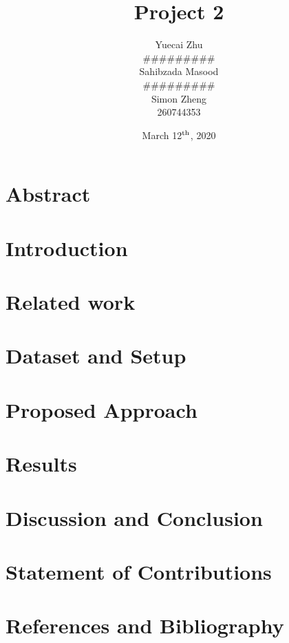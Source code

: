 \documentclass[11pt,letterpaper]{article}
\author{Yuecai Zhu\\#########\\Sahibzada Masood\\#########\\Simon Zheng\\260744353}
\title{Project 2}
\date{March 12$^{\textnormal{th}}$, 2020}
\begin{document}
	\maketitle
	\thispagestyle{fancy}
	
	\section{Abstract}
	
	
	\section{Introduction}


	\section{Related work}
	
	
	\section{Dataset and Setup}


	\section{Proposed Approach}
	
	
	\section{Results}
	
	
	\section{Discussion and Conclusion}
	
	
	\section{Statement of Contributions}
	
	
	\section{References and Bibliography}
	
\end{document}
